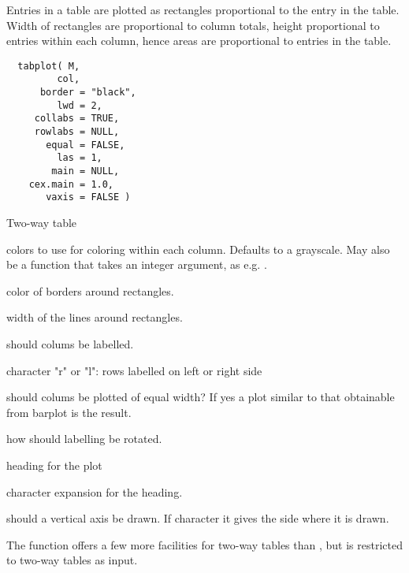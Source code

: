 \begin{Description}\relax
Entries in a table are plotted as rectangles proportional to the entry
in the table. Width of rectangles are proportional to column totals,
height proportional to entries within each column, hence areas are
proportional to entries in the table.
\end{Description}
\begin{Usage}
\begin{verbatim}
  tabplot( M,
         col,
      border = "black",
         lwd = 2,
     collabs = TRUE,
     rowlabs = NULL,
       equal = FALSE,
         las = 1,
        main = NULL,
    cex.main = 1.0,
       vaxis = FALSE )
\end{verbatim}
\end{Usage}
\begin{Arguments}
\begin{ldescription}
\item[\code{M}] Two-way table
\item[\code{col}] colors to use for coloring within each column. Defaults to
a grayscale. May also be a function that takes an integer argument,
as e.g. .
\item[\code{border}] color of borders around rectangles.
\item[\code{lwd}] width of the lines around rectangles.
\item[\code{collabs}] should colums be labelled.
\item[\code{rowlabs}] character "r" or "l": rows labelled on left or right side
\item[\code{equal}] should colums be plotted of equal width? If yes a plot
similar to that obtainable from barplot is the result.
\item[\code{las}] how should labelling be rotated.
\item[\code{main}] heading for the plot
\item[\code{cex.main}] character expansion for the heading.
\item[\code{vaxis}] should a vertical axis be drawn. If character it gives
the side where it is drawn.
\end{ldescription}
\end{Arguments}
\begin{Details}\relax
The function offers a few more facilities for two-way tables than
, but is restricted to two-way tables as
input.
\end{Details}
